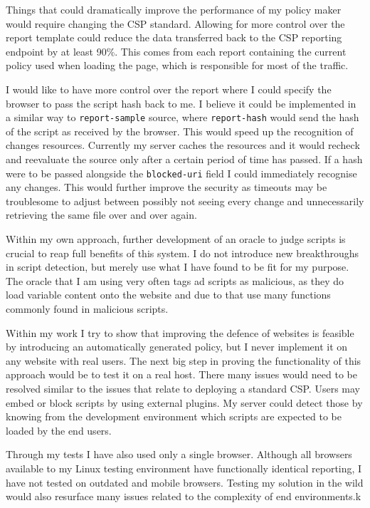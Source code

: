 Things that could dramatically improve the performance of my policy maker would require changing the CSP standard.
Allowing for more control over the report template could reduce the data transferred back to the CSP reporting endpoint by at least 90\%.
This comes from each report containing the current policy used when loading the page, which is responsible for most of the traffic.

I would like to have more control over the report where I could specify the browser to pass the script hash back to me.
I believe it could be implemented in a similar way to \texttt{report-sample} source, where \texttt{report-hash} would send the hash of the script as received by the browser.
This would speed up the recognition of changes resources. 
Currently my server caches the resources and it would recheck and reevaluate the source only after a certain period of time has passed.
If a hash were to be passed alongside the \texttt{blocked-uri} field I could immediately recognise any changes.
This would further improve the security as timeouts may be troublesome to adjust between possibly not seeing every change and unnecessarily retrieving the same file over and over again.

Within my own approach, further development of an oracle to judge scripts is crucial to reap full benefits of this system.
I do not introduce new breakthroughs in script detection, but merely use what I have found to be fit for my purpose.
The oracle that I am using very often tags ad scripts as malicious, as they do load variable content onto the website and due to that use many functions commonly found in malicious scripts.

Within my work I try to show that improving the defence of websites is feasible by introducing an automatically generated policy, but I never implement it on any website with real users.
The next big step in proving the functionality of this approach would be to test it on a real host.
There many issues would need to be resolved similar to the issues that relate to deploying a standard CSP.
Users may embed or block scripts by using external plugins. 
My server could detect those by knowing from the development environment which scripts are expected to be loaded by the end users. 

Through my tests I have also used only a single browser.
Although all browsers available to my Linux testing environment have functionally identical reporting, I have not tested on outdated and mobile browsers.
Testing my solution in the wild would also resurface many issues related to the complexity of end environments.k
